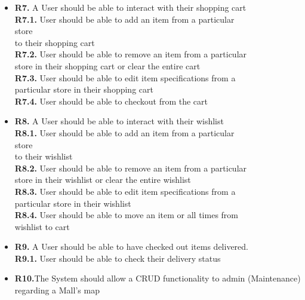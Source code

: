 \documentclass{article}
\begin{document}
\begin{itemize}
    \item[] \textbf{R7.} A User should be able to interact with their shopping cart\\
    \setlength{\parindent}{24pt}
    \indent \textbf{R7.1.} User should be able to add an item from a particular \\
    \indent store\\ 
    \indent to their shopping cart\\
    \indent \textbf{R7.2.} User should be able to remove an item from a particular\\
    \indent store in their shopping cart or clear the entire cart\\
    \indent \textbf{R7.3.} User should be able to edit item specifications from a \\ 
    \indent particular store in their shopping cart\\
    \indent \textbf{R7.4.} User should be able to checkout from the cart 
    
    \item[] \textbf{R8.} A User should be able to interact with their wishlist\\
    \setlength{\parindent}{24pt}
    \indent \textbf{R8.1.} User should be able to add an item from a particular\\ 
    \indent store\\ 
    \indent to their wishlist\\
    \indent \textbf{R8.2.} User should be able to remove an item from a particular\\
    \indent store in their wishlist or clear the entire wishlist\\
    \indent \textbf{R8.3.} User should be able to edit item specifications from a \\
    \indent particular store in their wishlist\\
    \indent \textbf{R8.4.} User should be able to move an item or all times from \\ \indent wishlist to cart 
    
    \item[] \textbf{R9.} A User should be able to have checked out items delivered.\\
    \indent \textbf{R9.1.} User should be able to check their delivery status\\
    
    \item[] \textbf{R10.}The System should allow a CRUD functionality to admin (Maintenance) regarding a Mall's map 
    
\end{itemize}
\end{document}
